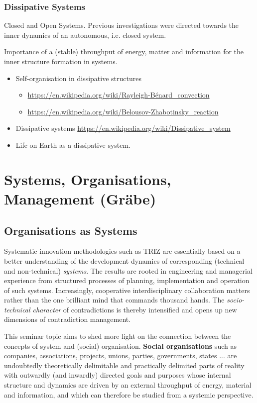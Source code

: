 \documentclass[11pt,a4paper]{article}
\begin{document}
\subsubsection{Dissipative Systems}

Closed and Open Systems. Previous investigations were directed towards the
inner dynamics of an autonomous, i.e. closed system.

Importance of a (stable) throughput of energy, matter and information for the
inner structure formation in systems.

\begin{itemize}
\item Self-organisation in dissipative structures
  \begin{itemize}
  \item \url{https://en.wikipedia.org/wiki/Rayleigh-Bénard_convection}
  \item \url{https://en.wikipedia.org/wiki/Belousov-Zhabotinsky_reaction}
  \end{itemize}
\item Dissipative systems
  \url{https://en.wikipedia.org/wiki/Dissipative_system} 
\item Life on Earth as a dissipative system.
\end{itemize}

\section{Systems, Organisations, Management (Gräbe)}

\subsection{Organisations as Systems}

Systematic innovation methodologies such as TRIZ are essentially based on a
better understanding of the development dynamics of corresponding (technical
and non-technical) \emph{systems}.  The results are rooted in engineering and
managerial experience from structured processes of planning, implementation
and operation of such systems. Increasingly, cooperative interdisciplinary
collaboration matters rather than the one brilliant mind that commands
thousand hands. The \emph{socio-technical character} of contradictions is
thereby intensified and opens up new dimensions of contradiction management.

This seminar topic aims to shed more light on the connection between the
concepts of system and (social) organisation. \textbf{Social organisations}
such as companies, associations, projects, unions, parties, governments,
states ... are undoubtedly theoretically delimitable and practically delimited
parts of reality with outwardly (and inwardly) directed goals and purposes
whose internal structure and dynamics are driven by an external throughput of
energy, material and information, and which can therefore be studied from a
systemic perspective.
\end{document}
